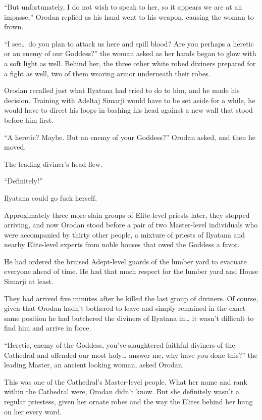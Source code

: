 \documentclass[a4paper,10pt]{book}
\begin{document}
“But unfortunately, I do not wish to speak to her, so it appears we are at an impasse,” Orodan replied as his hand went to his weapon, causing the woman to frown.\par
“I see… do you plan to attack us here and spill blood? Are you perhaps a heretic or an enemy of our Goddess?” the woman asked as her hands began to glow with a soft light as well. Behind her, the three other white robed diviners prepared for a fight as well, two of them wearing armor underneath their robes.\par
Orodan recalled just what Ilyatana had tried to do to him, and he made his decision. Training with Adeltaj Simarji would have to be set aside for a while, he would have to direct his loops in bashing his head against a new wall that stood before him first.\par
“A heretic? Maybe. But an enemy of your Goddess?” Orodan asked, and then he moved.\par
The leading diviner’s head flew.\par
“Definitely!”\par
Ilyatana could go fuck herself.\par
\par
Approximately three more slain groups of Elite-level priests later, they stopped arriving, and now Orodan stood before a pair of two Master-level individuals who were accompanied by thirty other people, a mixture of priests of Ilyatana and nearby Elite-level experts from noble houses that owed the Goddess a favor.\par
He had ordered the bruised Adept-level guards of the lumber yard to evacuate everyone ahead of time. He had that much respect for the lumber yard and House Simarji at least.\par
They had arrived five minutes after he killed the last group of diviners. Of course, given that Orodan hadn’t bothered to leave and simply remained in the exact same position he had butchered the diviners of Ilyatana in… it wasn’t difficult to find him and arrive in force.\par
“Heretic, enemy of the Goddess, you’ve slaughtered faithful diviners of the Cathedral and offended our most holy… answer me, why have you done this?” the leading Master, an ancient looking woman, asked Orodan.\par
This was one of the Cathedral’s Master-level people. What her name and rank within the Cathedral were, Orodan didn’t know. But she definitely wasn’t a regular priestess, given her ornate robes and the way the Elites behind her hung on her every word.\par
\end{document}
